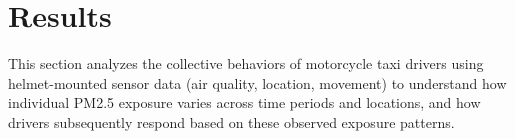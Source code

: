 \section{Results}

This section analyzes the collective behaviors of motorcycle taxi drivers using helmet-mounted sensor data (air quality, location, movement) to understand how individual PM2.5 exposure varies across time periods and locations, and how drivers subsequently respond based on these observed exposure patterns.

